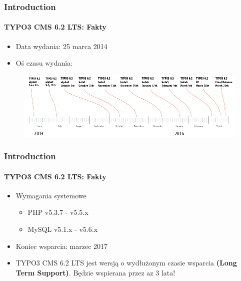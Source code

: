 \begin{frame}[fragile]
	\frametitle{Introduction}
	\framesubtitle{TYPO3 CMS 6.2 LTS: Fakty}

	\begin{itemize}
		\item Data wydania: 25 marca 2014
		\item Oś czasu wydania:
	\end{itemize}

	\begin{figure}
		\includegraphics[width=0.99\linewidth]{Images/Introduction/ReleaseTimeline.png}
	\end{figure}

\end{frame}


\begin{frame}[fragile]
	\frametitle{Introduction}
	\framesubtitle{TYPO3 CMS 6.2 LTS: Fakty}

	\begin{itemize}
		\item Wymagania systemowe
		\begin{itemize}
			\item PHP	\tabto{1.2cm} v5.3.7 - v5.5.x
			\item MySQL	\tabto{1.2cm} v5.1.x - v5.6.x
		\end{itemize}
	\end{itemize}

	\begin{itemize}
		\item Koniec wsparcia: marzec 2017
		\item TYPO3 CMS 6.2 LTS jest wersją o wydłużonym czasie wsparcia \textbf{(Long Term Support)}. Będzie wspierana przez az 3 lata!
	\end{itemize}

\end{frame}

